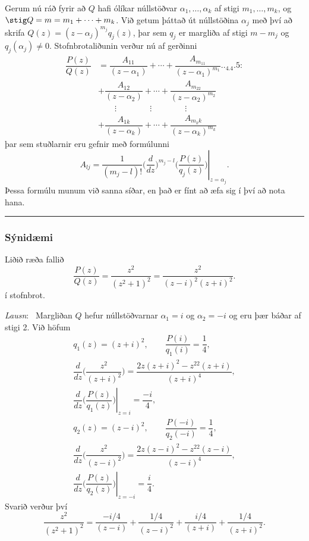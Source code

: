 Gerum nú ráð fyrir að $Q$ hafi ólíkar núllstöðvar
$\alpha_1,\dots,\alpha_k$ af stigi $m_1,\dots,m_k$,
og $\stig Q=m=m_1+\cdots+m_k$.  Við getum þáttað
út núllstöðina $\alpha_j$ með því að skrifa
$Q(z)=(z-\alpha_j)^{m_j}q_j(z)$, 
þar sem $q_j$ er margliða af stigi $m-m_j$ og $q_j(\alpha_j)\neq 0$.
Stofnbrotaliðunin verður nú af gerðinni 
\begin{align}
\dfrac{P(z)}{Q(z)}&=
\dfrac{A_{11}}{(z-\alpha_1)}+\cdots+\dfrac{A_{m_11}}{(z-\alpha_1)^{m_1}}


.. _4.4.5:
\\\
&+\dfrac{A_{12}}{(z-\alpha_2)}+\cdots+\dfrac{A_{m_22}}{(z-\alpha_2)^{m_2}}\nonumber\\
&\qquad \vdots\qquad\qquad\vdots\qquad \qquad \vdots\nonumber\\
&+\dfrac{A_{1k}}{(z-\alpha_k)}+\cdots+\dfrac{A_{m_kk}}{(z-\alpha_k)^{m_k}}\nonumber
\end{align}
þar sem stuðlarnir eru gefnir með formúlunni
$$ A_{lj}=\left.\dfrac 1{(m_j-l)!}
\bigg(\dfrac {d}{dz}\bigg)^{m_j-l}\bigg(
\dfrac{P(z)}{q_j(z)}\bigg)\right|_{z=\alpha_j}.
$$
Þessa formúlu munum við sanna  síðar, en  það er fínt að æfa
sig í því að nota hana.

\bigskip\hrule\bigskip

\subsubsection{Sýnidæmi}  Liðið ræða fallið
 $$\dfrac {P(z)}{Q(z)}=\dfrac{z^2}{(z^2+1)^2}=\dfrac{z^2}{(z-i)^2(z+i)^2}.
 $$
í stofnbrot.

\smallskip\noindent
{\it Lausn}: \ 
Margliðan $Q$ hefur núllstöðvarnar $\alpha_1=i$ og $\alpha_2=-i$ og eru
þær báðar af stigi 2.  Við höfum
\begin{gather*}
q_1(z)=(z+i)^2, \qquad \dfrac{P(i)}{q_1(i)}= \dfrac 14,\\
\dfrac d{dz}\bigg(\dfrac{z^2}{(z+i)^2}\bigg)= \dfrac
{2z(z+i)^2-z^22(z+i)}{(z+i)^4},\\
\left.\dfrac d{dz}\bigg(\dfrac{P(z)}{q_1(z)}\bigg)\right|_{z=i}
=\dfrac{-i}4,\\
q_2(z)=(z-i)^2, \qquad \dfrac{P(-i)}{q_2(-i)}= \dfrac 14,\\
\dfrac d{dz}\bigg(\dfrac{z^2}{(z-i)^2}\bigg)= \dfrac
{2z(z-i)^2-z^22(z-i)}{(z-i)^4},\\
\left.\dfrac d{dz}\bigg(\dfrac{P(z)}{q_2(z)}\bigg)\right|_{z=-i}
=\dfrac{i}4.
\end{gather*}
 Svarið verður því 
 $$\dfrac{z^2}{(z^2+1)^2}=
\dfrac{-i/4}{(z-i)}+\dfrac{1/4}{(z-i)^2} +
\dfrac {i/4}{(z+i)}+\dfrac{1/4}{(z+i)^2}.
 $$


